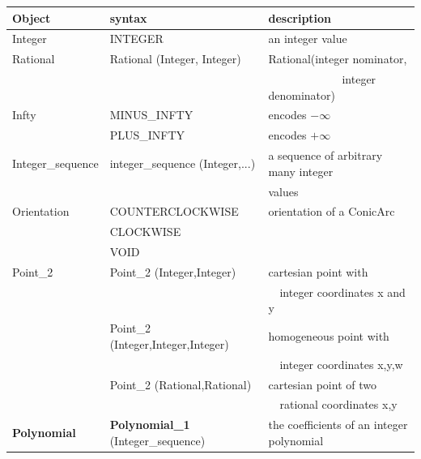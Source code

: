 \begin{ccTexOnly}
\begin{tabular}{*{3}{| l} |} \hline
Object   & syntax                         & description \\ \hline \hline
Integer  & INTEGER                        & an integer value \\ \hline
Rational & Rational (Integer, Integer)    & Rational(integer nominator, \\
         &                                & \ \ \ \ \ \ \ \ \ \ \ \ \ integer denominator)
                                            \\ \hline
Infty    & MINUS\_INFTY                   & encodes $-\infty$ \\ 
         & PLUS\_INFTY                    & encodes $+\infty$  \\ \hline

Integer\_sequence & integer\_sequence (Integer,...)      
                        & a sequence of arbitrary many integer  \\ 
                  &     &  values \\ \hline
Orientation & COUNTERCLOCKWISE            & orientation of a ConicArc  \\
            & CLOCKWISE                   &           \\
            & VOID                        &           \\ \hline

Point\_2 & Point\_2 (Integer,Integer)     & cartesian point with \\
         &                                & \ \ integer coordinates x and y \\
         & Point\_2 (Integer,Integer,Integer) & homogeneous point with \\ 
         &                                & \ \ integer coordinates x,y,w\\
         & Point\_2 (Rational,Rational)   & cartesian point of two \\
         &                                & \ \ rational coordinates x,y\\ \hline
{\bf Polynomial}    & {\bf Polynomial\_1} (Integer\_sequence) 
                             & the coefficients of an integer polynomial \\ \hline


\end{tabular}
\end{ccTexOnly}
